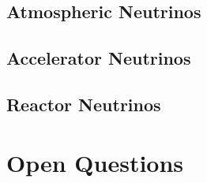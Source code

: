 \subsection{Atmospheric Neutrinos}
\label{subsec:NeutrinoOscillationPhysics_AtmosphericNeutrinos}

\subsection{Accelerator Neutrinos}
\label{subsec:NeutrinoOscillationPhysics_AcceleratorNeutrinos}

\subsection{Reactor Neutrinos}
\label{subsec:NeutrinoOscillationPhysics_ReactorNeutrinos}

\section{Open Questions}
\label{sec:NeutrinoOscillationPhysics_OpenQuestions}
